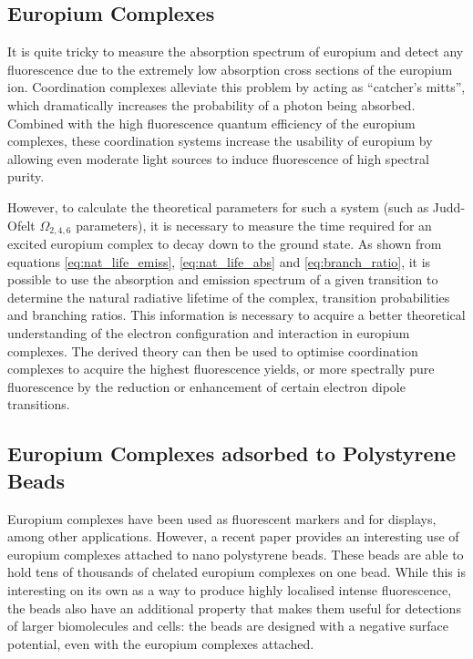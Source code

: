 \subsection{Europium Complexes}

It is quite tricky to measure the absorption spectrum of europium and detect any fluorescence due to the extremely low absorption cross sections of the europium ion. Coordination complexes alleviate this problem by acting as ``catcher's mitts'', which dramatically increases the probability of a photon being absorbed. Combined with the high fluorescence quantum efficiency of the europium complexes, these coordination systems increase the usability of europium by allowing even moderate light sources to induce fluorescence of high spectral purity.

However, to calculate the theoretical parameters for such a system (such as
Judd-Ofelt $\Omega_{2,4,6}$ parameters), it is necessary to measure the time
required for an excited europium complex to decay down to the ground state. As
shown from equations \eqref{eq:nat_life_emiss}, \eqref{eq:nat_life_abs} and
\eqref{eq:branch_ratio}, it is possible to use the absorption and emission
spectrum of a given transition to determine the natural radiative lifetime of the complex, transition probabilities and branching ratios. This information is necessary to acquire a better theoretical understanding of the electron configuration and interaction in europium complexes. The derived theory can then be used to optimise coordination complexes to acquire the highest fluorescence yields, or more spectrally pure fluorescence by the reduction or enhancement of certain electron dipole transitions.

\subsection{Europium Complexes adsorbed to Polystyrene Beads}

Europium complexes have been used as fluorescent markers and for displays, among other applications. However, a recent paper provides an interesting use of europium complexes attached to nano polystyrene beads. These beads are able to hold tens of thousands of chelated europium complexes on one bead. While this is interesting on its own as a way to produce highly localised intense fluorescence, the beads also have an additional property that makes them useful for detections of larger biomolecules and cells: the beads are designed with a negative surface potential, even with the europium complexes attached.

